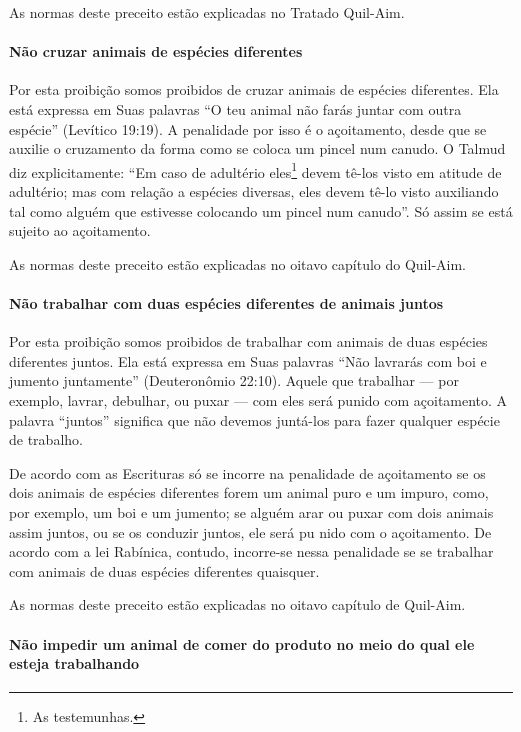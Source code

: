 As normas deste preceito estão explicadas no Tratado Quil-Aim.

\paragraph{Não cruzar animais de espécies diferentes}

Por esta proibição somos proibidos de cruzar animais de espécies
diferentes. Ela está expressa em Suas palavras ``O teu animal não farás
juntar com outra espécie'' (Levítico 19:19). A penalidade por isso é o
açoitamento, desde que se auxilie o cruzamento da forma como se coloca
um pincel num canudo. O Talmud diz explicitamente: ``Em caso de
adultério eles\footnote{As testemunhas.} devem tê-los visto em atitude de
adultério; mas com relação a espécies diversas, eles devem tê-lo visto
auxiliando tal como alguém que estivesse colocando um pincel num
canudo''. Só assim se está sujeito ao açoitamento.

As normas deste preceito estão explicadas no oitavo capítulo do Quil-Aim.

\paragraph{Não trabalhar com duas espécies diferentes de animais juntos}

Por esta proibição somos proibidos de trabalhar com animais de duas
espécies diferentes juntos. Ela está expressa em Suas palavras ``Não
lavrarás com boi e jumento juntamente'' (Deuteronômio 22:10). Aquele que trabalhar
--- por exemplo, lavrar, debulhar, ou puxar --- com eles será punido com
açoitamento. A palavra ``juntos'' significa que não devemos juntá-los
para fazer qualquer espécie de trabalho.

De acordo com as Escrituras só se incorre na penalidade de açoitamento
se os dois animais de espécies diferentes forem um animal puro e um
impuro, como, por exemplo, um boi e um jumento; se alguém arar ou puxar
com dois animais assim juntos, ou se os conduzir juntos, ele será pu
nido com o açoitamento. De acordo com a lei Rabínica, contudo,
incorre-se nessa penalidade se se trabalhar com animais de duas espécies
diferentes quaisquer.

As normas deste preceito estão explicadas no oitavo capítulo de Quil-Aim.

\paragraph{Não impedir um animal de comer do produto no meio do qual ele esteja
trabalhando}

